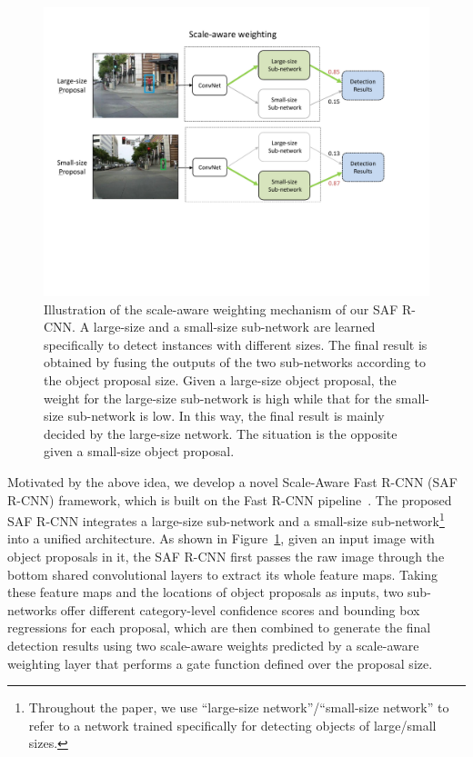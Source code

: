 \documentclass[journal]{IEEEtran}
\begin{document}
\begin{figure}
	\begin{center}
		\includegraphics[scale=0.52]{figures/weight.pdf}
		\caption{{Illustration of the scale-aware weighting mechanism of our SAF R-CNN. A large-size and a small-size sub-network are learned specifically to detect instances with different sizes. The final result is obtained by fusing the outputs of the two sub-networks according to the object proposal size. Given a large-size object proposal, the weight for the large-size sub-network is high while that for the small-size sub-network is low. In this way, the final result is mainly decided by the large-size network. The situation is the opposite given a small-size object proposal.}}	
		\label{fig:weighting}
	\end{center}
	\vspace{-4mm}
\end{figure}


Motivated by the above idea, we develop a novel Scale-Aware Fast R-CNN (SAF R-CNN) framework, which is built on the Fast R-CNN pipeline~\cite{girshick2015fast}. The proposed SAF R-CNN integrates a large-size sub-network and a small-size sub-network\footnote{Throughout the paper, we use ``large-size network''/``small-size network'' to refer to a network trained specifically for detecting objects of large/small sizes.} into a unified architecture. As shown in Figure~\ref{fig:weighting}, given an input image with object proposals in it, the SAF R-CNN first passes the raw image through the bottom shared convolutional layers to extract its whole feature maps. Taking these feature maps and the locations of object proposals as inputs, two sub-networks offer different category-level confidence scores and bounding box regressions for each proposal, which are then combined to generate the final detection results using two scale-aware weights predicted by a scale-aware weighting layer that performs a gate function defined over the proposal size. 
\end{document}
